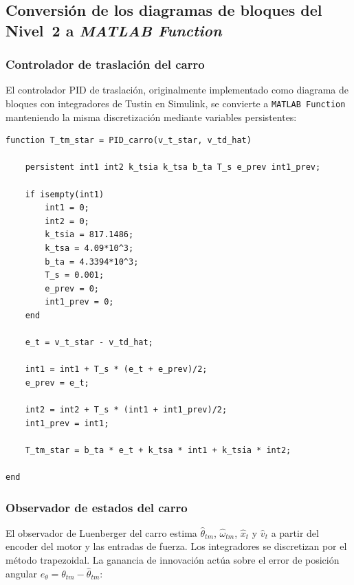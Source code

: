 \documentclass[12pt, a4paper]{article}
\begin{document}
\subsection{Conversión de los diagramas de bloques del Nivel~2 a \textit{MATLAB Function}}

\subsubsection{Controlador de traslación del carro}

El controlador PID de traslación, originalmente implementado como diagrama de bloques
con integradores de Tustin en Simulink, se convierte a \texttt{MATLAB Function}
manteniendo la misma discretización mediante variables persistentes:

\begin{lstlisting}[style=matlab, basicstyle=\ttfamily\scriptsize, caption={MATLAB Function: controlador PID de traslación del carro ($T_{s2}=1$\,ms).}, label=lst:pid-carro]
function T_tm_star = PID_carro(v_t_star, v_td_hat)

    persistent int1 int2 k_tsia k_tsa b_ta T_s e_prev int1_prev;

    if isempty(int1)
        int1 = 0;
        int2 = 0;
        k_tsia = 817.1486;
        k_tsa = 4.09*10^3;
        b_ta = 4.3394*10^3;
        T_s = 0.001;
        e_prev = 0;
        int1_prev = 0;
    end

    e_t = v_t_star - v_td_hat;

    int1 = int1 + T_s * (e_t + e_prev)/2;
    e_prev = e_t;

    int2 = int2 + T_s * (int1 + int1_prev)/2;
    int1_prev = int1;

    T_tm_star = b_ta * e_t + k_tsa * int1 + k_tsia * int2;

end
\end{lstlisting}

\subsubsection{Observador de estados del carro}

El observador de Luenberger del carro estima $\hat{\theta}_{tm}$, $\hat{\omega}_{tm}$,
$\hat{x}_t$ y $\hat{v}_t$ a partir del encoder del motor y las entradas de fuerza.
Los integradores se discretizan por el método trapezoidal. La ganancia de innovación
actúa sobre el error de posición angular $e_\theta = \theta_{tm} - \hat{\theta}_{tm}$:
\end{document}
